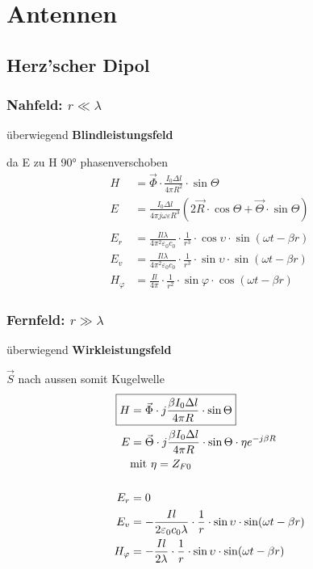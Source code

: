 \section{Antennen}
\subsection{Herz'scher Dipol}
\subsubsection{Nahfeld: $r \ll \lambda$}

überwiegend \textbf{Blindleistungsfeld}

da E zu H 90° phasenverschoben
\begin{align*}
    H &= \vec{\Phi}\cdot\frac{I_0 \Delta l}{4\pi R^2}\cdot \sin\Theta\\
    E &= \frac{I_0 \Delta l}{4\pi j \omega\varepsilon R^3}(2\vec{R} \cdot \cos\Theta + \vec{\Theta}\cdot \sin\Theta)\\
    \\
    E_r &= \frac{I l \lambda}{4\pi^2\varepsilon_0  c_0}\cdot \frac{1}{r^3} \cdot\cos\upsilon \cdot \sin(\omega t - \beta r)\\
    E_v &= \frac{I l \lambda}{4\pi^2\varepsilon_0  c_0}\cdot \frac{1}{r^3} \cdot\sin\upsilon \cdot \sin(\omega t - \beta r)\\
    H_\varphi &= \frac{I l}{4\pi}\cdot \frac{1}{r^2}\cdot\sin\varphi\cdot\cos(\omega t -\beta r)
\end{align*}

\subsubsection{Fernfeld: $r \gg \lambda$}

überwiegend \textbf{Wirkleistungsfeld}

$\vec{S}$ nach aussen somit Kugelwelle
\begin{align*}
    \Aboxed{
        H &= \vec{\Phi}\cdot j\frac{\beta I_0 \Delta l}{4\pi R}\cdot \sin\Theta}\\
        E &= \vec{\Theta}\cdot j\frac{\beta I_0 \Delta l }{4\pi R} \cdot \sin\Theta \cdot\eta e^{-j\beta R}\\
    &\text{mit } \eta = Z_{F0}\\
    \\
    E_r &= 0\\
    E_v &= -\frac{I l }{2\varepsilon_0  c_0 \lambda}\cdot \frac{1}{r} \cdot\sin\upsilon \cdot \sin(\omega t - \beta r)\\
    H_\varphi &= -\frac{I l}{2\lambda}\cdot \frac{1}{r}\cdot\sin\upsilon\cdot\sin(\omega t -\beta r)
\end{align*}

